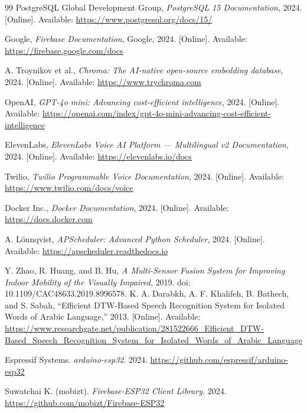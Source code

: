 \documentclass[12pt,a4paper]{report}
\begin{document}
\begin{singlespace}
\begin{thebibliography}{99}
PostgreSQL Global Development Group,
\textit{PostgreSQL 15 Documentation},
2024. [Online]. Available: \url{https://www.postgresql.org/docs/15/}

Google,
\textit{Firebase Documentation},
Google, 2024. [Online]. Available: \url{https://firebase.google.com/docs}

A. Troynikov et al.,
\textit{Chroma: The AI-native open-source embedding database},
2024. [Online]. Available: \url{https://www.trychroma.com}

OpenAI,
\textit{GPT-4o mini: Advancing cost-efficient intelligence},
2024. [Online]. Available: \url{https://openai.com/index/gpt-4o-mini-advancing-cost-efficient-intelligence}



ElevenLabs,
\textit{ElevenLabs Voice AI Platform --- Multilingual v2 Documentation},
2024. [Online]. Available: \url{https://elevenlabs.io/docs}

Twilio,
\textit{Twilio Programmable Voice Documentation},
2024. [Online]. Available: \url{https://www.twilio.com/docs/voice}

Docker Inc.,
\textit{Docker Documentation},
2024. [Online]. Available: \url{https://docs.docker.com}

A. L\"{o}nnqvist,
\textit{APScheduler: Advanced Python Scheduler},
2024. [Online]. Available: \url{https://apscheduler.readthedocs.io}







Y. Zhao, R. Huang, and B. Hu,
\textit{A Multi-Sensor Fusion System for Improving Indoor Mobility of the Visually Impaired},
2019. doi: 10.1109/CAC48633.2019.8996578.
K. A. Darabkh, A. F. Khalifeh, B. Bathech, and S. Sabah, ``Efficient DTW-Based Speech Recognition System for Isolated Words of Arabic Language,''
2013. [Online]. Available:
\url{https://www.researchgate.net/publication/281522666_Efficient_DTW-Based_Speech_Recognition_System_for_Isolated_Words_of_Arabic_Language}

Espressif Systems.
\textit{arduino-esp32}.
2024.
\newline
\url{https://github.com/espressif/arduino-esp32}

Suwatchai K. (mobizt).
\textit{Firebase-ESP32 Client Library}.
2024.
\newline
\url{https://github.com/mobizt/Firebase-ESP32}


\end{thebibliography}
\end{singlespace}
\end{document}
